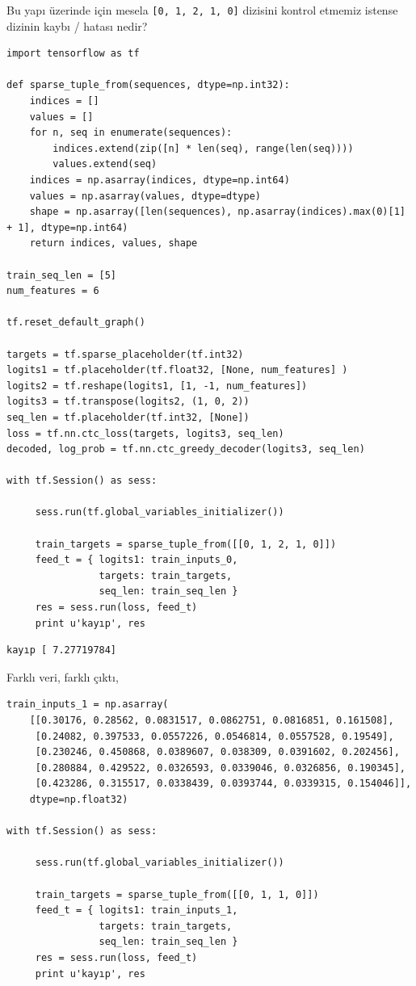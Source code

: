\documentclass[12pt,fleqn]{article}\usepackage{../../common}
\begin{document}
Bu yapı üzerinde için mesela \verb![0, 1, 2, 1, 0]! dizisini kontrol
etmemiz istense dizinin kaybı / hatası nedir?

\begin{verbatim}
import tensorflow as tf

def sparse_tuple_from(sequences, dtype=np.int32):
    indices = []
    values = []
    for n, seq in enumerate(sequences):
        indices.extend(zip([n] * len(seq), range(len(seq))))
        values.extend(seq)
    indices = np.asarray(indices, dtype=np.int64)
    values = np.asarray(values, dtype=dtype)
    shape = np.asarray([len(sequences), np.asarray(indices).max(0)[1] + 1], dtype=np.int64)
    return indices, values, shape

train_seq_len = [5]
num_features = 6

tf.reset_default_graph()

targets = tf.sparse_placeholder(tf.int32)
logits1 = tf.placeholder(tf.float32, [None, num_features] )
logits2 = tf.reshape(logits1, [1, -1, num_features])
logits3 = tf.transpose(logits2, (1, 0, 2))
seq_len = tf.placeholder(tf.int32, [None])
loss = tf.nn.ctc_loss(targets, logits3, seq_len)
decoded, log_prob = tf.nn.ctc_greedy_decoder(logits3, seq_len)

with tf.Session() as sess:

     sess.run(tf.global_variables_initializer())

     train_targets = sparse_tuple_from([[0, 1, 2, 1, 0]])     
     feed_t = { logits1: train_inputs_0, 
                targets: train_targets, 
                seq_len: train_seq_len }
     res = sess.run(loss, feed_t)     
     print u'kayıp', res
\end{verbatim}

\begin{verbatim}
kayıp [ 7.27719784]
\end{verbatim}

Farklı veri, farklı çıktı,

\begin{verbatim}
train_inputs_1 = np.asarray(
    [[0.30176, 0.28562, 0.0831517, 0.0862751, 0.0816851, 0.161508],
     [0.24082, 0.397533, 0.0557226, 0.0546814, 0.0557528, 0.19549],
     [0.230246, 0.450868, 0.0389607, 0.038309, 0.0391602, 0.202456],
     [0.280884, 0.429522, 0.0326593, 0.0339046, 0.0326856, 0.190345],
     [0.423286, 0.315517, 0.0338439, 0.0393744, 0.0339315, 0.154046]],
    dtype=np.float32)

with tf.Session() as sess:

     sess.run(tf.global_variables_initializer())

     train_targets = sparse_tuple_from([[0, 1, 1, 0]])     
     feed_t = { logits1: train_inputs_1, 
                targets: train_targets, 
                seq_len: train_seq_len }
     res = sess.run(loss, feed_t)     
     print u'kayıp', res
\end{verbatim}
\end{document}
